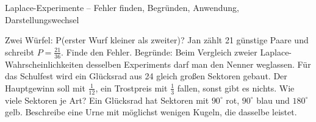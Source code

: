 \begin{aufgabe}{Laplace-Experimente – Fehler finden, Begründen, Anwendung, Darstellungswechsel}
\begin{teile}
\teil Zwei Würfel: P(erster Wurf kleiner als zweiter)? Jan zählt 21 günstige Paare und schreibt $P = \frac{21}{36}$. Finde den Fehler.
\teil Begründe: Beim Vergleich zweier Laplace-Wahrscheinlichkeiten desselben Experiments darf man den Nenner weglassen.
\teil Für das Schulfest wird ein Glücksrad aus 24 gleich großen Sektoren gebaut. Der Hauptgewinn soll mit $\frac{1}{12}$, ein Trostpreis mit $\frac{1}{3}$ fallen, sonst gibt es nichts. Wie viele Sektoren je Art? \leerfeld
\teil Ein Glücksrad hat Sektoren mit $90^\circ$ rot, $90^\circ$ blau und $180^\circ$ gelb. Beschreibe eine Urne mit möglichst wenigen Kugeln, die dasselbe leistet. \leerfeld
\end{teile}
\end{aufgabe}
